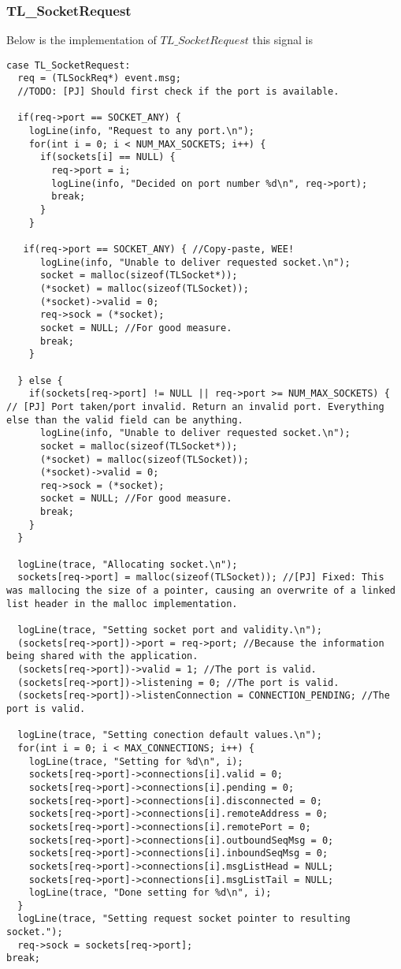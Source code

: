 \subsubsection{TL\_SocketRequest}
Below is the implementation of $TL\_SocketRequest$ this signal is 
\begin{lstlisting}
case TL_SocketRequest:
  req = (TLSockReq*) event.msg;
  //TODO: [PJ] Should first check if the port is available.

  if(req->port == SOCKET_ANY) {
    logLine(info, "Request to any port.\n");
    for(int i = 0; i < NUM_MAX_SOCKETS; i++) {
      if(sockets[i] == NULL) {
        req->port = i;
        logLine(info, "Decided on port number %d\n", req->port);
        break;
      }
    }

   if(req->port == SOCKET_ANY) { //Copy-paste, WEE!
      logLine(info, "Unable to deliver requested socket.\n");
      socket = malloc(sizeof(TLSocket*));
      (*socket) = malloc(sizeof(TLSocket));
      (*socket)->valid = 0;
      req->sock = (*socket);
      socket = NULL; //For good measure.
      break;
    }

  } else {
    if(sockets[req->port] != NULL || req->port >= NUM_MAX_SOCKETS) { // [PJ] Port taken/port invalid. Return an invalid port. Everything else than the valid field can be anything.
      logLine(info, "Unable to deliver requested socket.\n");
      socket = malloc(sizeof(TLSocket*));
      (*socket) = malloc(sizeof(TLSocket));
      (*socket)->valid = 0;
      req->sock = (*socket);
      socket = NULL; //For good measure.
      break;
    }
  }

  logLine(trace, "Allocating socket.\n");
  sockets[req->port] = malloc(sizeof(TLSocket)); //[PJ] Fixed: This was mallocing the size of a pointer, causing an overwrite of a linked list header in the malloc implementation.

  logLine(trace, "Setting socket port and validity.\n");
  (sockets[req->port])->port = req->port; //Because the information being shared with the application.
  (sockets[req->port])->valid = 1; //The port is valid.
  (sockets[req->port])->listening = 0; //The port is valid.
  (sockets[req->port])->listenConnection = CONNECTION_PENDING; //The port is valid.

  logLine(trace, "Setting conection default values.\n");
  for(int i = 0; i < MAX_CONNECTIONS; i++) {
    logLine(trace, "Setting for %d\n", i);
    sockets[req->port]->connections[i].valid = 0;
    sockets[req->port]->connections[i].pending = 0;
    sockets[req->port]->connections[i].disconnected = 0;
    sockets[req->port]->connections[i].remoteAddress = 0;
    sockets[req->port]->connections[i].remotePort = 0;
    sockets[req->port]->connections[i].outboundSeqMsg = 0;
    sockets[req->port]->connections[i].inboundSeqMsg = 0;
    sockets[req->port]->connections[i].msgListHead = NULL;
    sockets[req->port]->connections[i].msgListTail = NULL;
    logLine(trace, "Done setting for %d\n", i);
  }
  logLine(trace, "Setting request socket pointer to resulting socket.");
  req->sock = sockets[req->port];
break;
\end{lstlisting}

